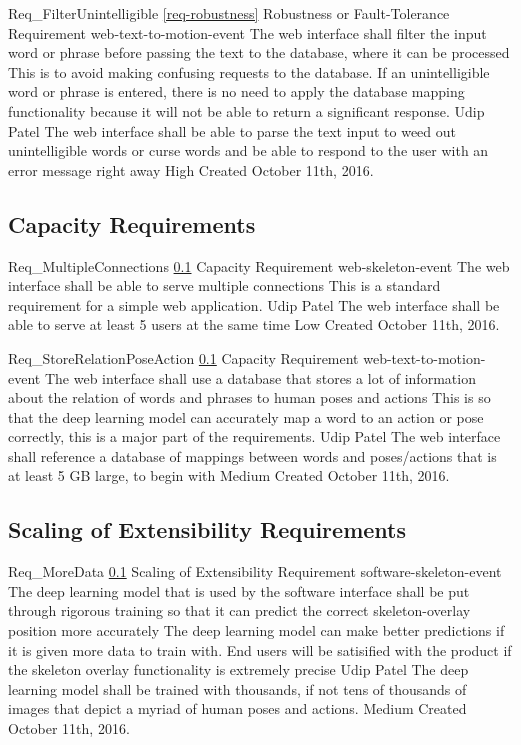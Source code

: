 \documentclass{scrreprt}
\begin{document}
\requirement
{Req_FilterUnintelligible}
{\ref{req-robustness} Robustness or Fault-Tolerance Requirement}
{web-text-to-motion-event}
{The web interface shall filter the input word or phrase before passing the text to the database, where it can be processed}
{This is to avoid making confusing requests to the database. If an unintelligible word or phrase is entered, there is no need to apply the database mapping functionality because it will not be able to return a significant response.}
{Udip Patel}
{The web interface shall be able to parse the text input to weed out unintelligible words or curse words and be able to respond to the user with an error message right away }
{High}
{Created October 11th, 2016.}

\subsection{Capacity Requirements}
\label{req-capacity}

\requirement
{Req_MultipleConnections}
{\ref{req-capacity} Capacity Requirement}
{web-skeleton-event}
{The web interface shall be able to serve multiple connections}
{This is a standard requirement for a simple web application.}
{Udip Patel}
{The web interface shall be able to serve at least 5 users at the same time}
{Low}
{Created October 11th, 2016.}

\requirement
{Req_StoreRelationPoseAction}
{\ref{req-capacity} Capacity Requirement}
{web-text-to-motion-event}
{The web interface shall use a database that stores a lot of information about the relation of words and phrases to human poses and actions}
{This is so that the deep learning model can accurately map a word to an action or pose correctly, this is a major part of the requirements.}
{Udip Patel}
{The web interface shall reference a database of mappings between words and poses/actions that is at least 5 GB large, to begin with }
{Medium}
{Created October 11th, 2016.}


\subsection{Scaling of Extensibility Requirements}
\label{req-scaling}

\requirement
{Req_MoreData}
{\ref{req-capacity} Scaling of Extensibility Requirement}
{software-skeleton-event}
{The deep learning model that is used by the software interface shall be put through rigorous training so that it can predict the correct skeleton-overlay position more accurately}
{The deep learning model can make better predictions if it is given more data to train with. End users will be satisified with the product if the skeleton overlay functionality is extremely precise}
{Udip Patel}
{The deep learning model shall be trained with thousands, if not tens of thousands of images that depict a myriad of human poses and actions.}
{Medium}
{Created October 11th, 2016.}
\end{document}
